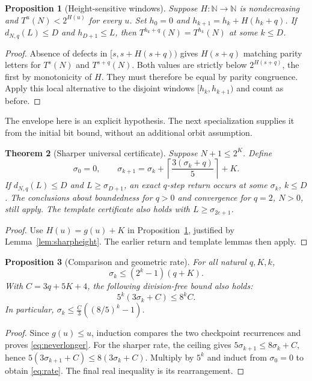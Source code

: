 \documentclass[11pt]{article}
\newtheorem{theorem}{Theorem}[section]
\newtheorem{proposition}[theorem]{Proposition}
\newcommand{\N}{\mathbb N}
\begin{document}
\begin{proposition}[Height-sensitive windows]\label{prop:heightwindow}
Suppose $H:\N\to\N$ is nondecreasing and $T^u(N)<2^{H(u)}$ for every $u$.
Set $h_0=0$ and $h_{k+1}=h_k+H(h_k+q)$. If $d_{N,q}(L)\le D$ and
$h_{D+1}\le L$, then $T^{h_k+q}(N)=T^{h_k}(N)$ at some $k\le D$.
\end{proposition}
\begin{proof}
Absence of defects in $[s,s+H(s+q))$ gives $H(s+q)$ matching parity
letters for $T^s(N)$ and $T^{s+q}(N)$. Both values are strictly below
$2^{H(s+q)}$, the first by monotonicity of $H$. They must therefore be
equal by parity congruence. Apply this local alternative to the disjoint
windows $[h_k,h_{k+1})$ and count as before.
\end{proof}
The envelope here is an explicit hypothesis. The next specialization
supplies it from the initial bit bound, without an additional orbit assumption.

\begin{theorem}[Sharper universal certificate]\label{thm:sharp}
Suppose $N+1\le2^K$. Define
\begin{equation}\label{eq:sharpcheckpoints}
\sigma_0=0,\qquad \sigma_{k+1}=\sigma_k+
\left\lceil\frac{3(\sigma_k+q)}5\right\rceil+K.
\end{equation}
If $d_{N,q}(L)\le D$ and $L\ge\sigma_{D+1}$, an exact $q$-step return
occurs at some $\sigma_k$, $k\le D$. The conclusions about boundedness
for $q>0$ and convergence for $q=2$, $N>0$, still apply. The template
certificate also holds with $L\ge\sigma_{2e+1}$.
\end{theorem}
\begin{proof}
Use $H(u)=g(u)+K$ in Proposition~\ref{prop:heightwindow}, justified by
Lemma~\ref{lem:sharpheight}. The earlier return and template lemmas then apply.
\end{proof}

\begin{proposition}[Comparison and geometric rate]\label{prop:rate}
For all natural $q,K,k$,
\begin{equation}\label{eq:neverlonger}
\sigma_k\le(2^k-1)(q+K).
\end{equation}
With $C=3q+5K+4$, the following division-free bound also holds:
\begin{equation}\label{eq:rate}
5^k(3\sigma_k+C)\le8^kC.
\end{equation}
In particular, $\sigma_k\le\frac C3((8/5)^k-1)$.
\end{proposition}
\begin{proof}
Since $g(u)\le u$, induction compares the two checkpoint recurrences
and proves \eqref{eq:neverlonger}. For the sharper rate, the ceiling gives
$5\sigma_{k+1}\le8\sigma_k+C$, hence
$5(3\sigma_{k+1}+C)\le8(3\sigma_k+C)$.
Multiply by $5^k$ and induct from $\sigma_0=0$ to obtain \eqref{eq:rate}.
The final real inequality is its rearrangement.
\end{proof}
\end{document}
